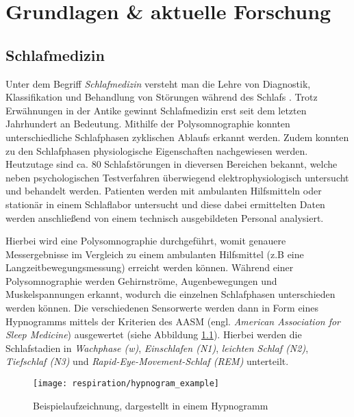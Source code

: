 
\chapter{Grundlagen \& aktuelle Forschung}
\label{ch:Basics}

\section{Schlafmedizin}
\label{ch:Basics:se:schlafmedizin}
Unter dem Begriff \textit{Schlafmedizin} versteht man die Lehre von Diagnostik, Klassifikation und Behandlung von Störungen während des Schlafs \cite{croenleinSchlafmedizin1x1Praxisorientiertes2017}. 
Trotz Erwähnungen in der Antike gewinnt Schlafmedizin erst seit dem letzten Jahrhundert an Bedeutung.
Mithilfe der Polysomnographie konnten unterschiedliche Schlafphasen zyklischen Ablaufs erkannt werden.
Zudem konnten zu den Schlafphasen physiologische Eigenschaften nachgewiesen werden.
Heutzutage sind ca. 80 Schlafstörungen in dieversen Bereichen bekannt, welche neben psychologischen Testverfahren überwiegend elektrophysiologisch untersucht und behandelt werden.
Patienten werden mit ambulanten Hilfsmitteln oder stationär in einem Schlaflabor untersucht und diese dabei ermittelten Daten werden anschließend von einem technisch ausgebildeten Personal analysiert.

Hierbei wird eine Polysomnographie durchgeführt, womit genauere Messergebnisse im Vergleich zu einem ambulanten Hilfsmittel (z.B eine Langzeitbewegungsmessung) erreicht werden können.
Während einer Polysomnographie werden Gehirnströme, Augenbewegungen und Muskelspannungen erkannt, wodurch die einzelnen Schlafphasen unterschieden werden können.
Die verschiedenen Sensorwerte werden dann in Form eines Hypnogramms mittels der Kriterien des AASM (engl. \textit{American Association for Sleep Medicine}) ausgewertet (siehe Abbildung \ref{hypnogram_example}). 
Hierbei werden die Schlafstadien in \textit{Wachphase (w)}, \textit{Einschlafen (N1)}, \textit{leichten Schlaf (N2)}, \textit{Tiefschlaf (N3)} und \textit{Rapid-Eye-Movement-Schlaf (REM)} unterteilt.

\begin{figure}[ht]
    \centering
    \texttt{[image: respiration/hypnogram\_example]}
    \caption{Beispielaufzeichnung, dargestellt in einem Hypnogramm \cite{stuckPraxisSchlafmedizinDiagnostik2018}}
    \label{hypnogram_example}
\end{figure}

